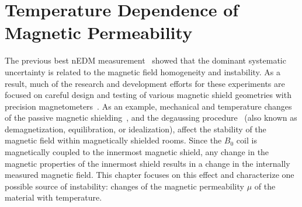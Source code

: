 \chapter{Temperature Dependence of Magnetic Permeability\label{chap:muofT}}

The previous best nEDM measurement~\cite{Pendlebury2015} showed that
the dominant systematic uncertainty is related to the magnetic field
homogeneity and instability. As a result, much of the research and
development efforts for these experiments are focused on careful
design and testing of various magnetic shield geometries with
precision magnetometers~\cite{altarev2014magnetically,
  brys2005magnetic,afach2014dynamic,patton2014all}. As an example,
mechanical and temperature changes of the passive magnetic
shielding~\cite{voigt2013,thiel2007demagnetization}, and the
degaussing
procedure~\cite{thiel2007demagnetization,altarev2015minimizing,sun2016dynamic}
(also known as demagnetization, equilibration, or idealization),
affect the stability of the magnetic field within magnetically
shielded rooms. Since the $B_0$ coil is magnetically coupled to the
innermost magnetic shield, any change in the magnetic properties of
the innermost shield results in a change in the internally measured
magnetic field. This chapter focuses on this effect and characterize
one possible source of instability: changes of the magnetic
permeability $\mu$ of the material with temperature.




